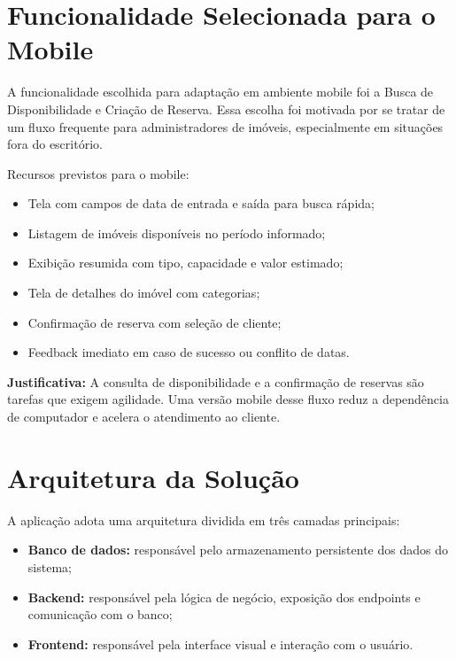 \documentclass[12pt, a4paper]{article}
\begin{document}
\section{Funcionalidade Selecionada para o Mobile}

A funcionalidade escolhida para adaptação em ambiente mobile foi a Busca de Disponibilidade e Criação de Reserva. Essa escolha foi motivada por se tratar de um fluxo frequente para administradores de imóveis, especialmente em situações fora do escritório.

Recursos previstos para o mobile:

\begin{itemize}[leftmargin=1.5em]
  \item Tela com campos de data de entrada e saída para busca rápida;
  \item Listagem de imóveis disponíveis no período informado;
  \item Exibição resumida com tipo, capacidade e valor estimado;
  \item Tela de detalhes do imóvel com categorias;
  \item Confirmação de reserva com seleção de cliente;
  \item Feedback imediato em caso de sucesso ou conflito de datas.
\end{itemize}

\textbf{Justificativa:} A consulta de disponibilidade e a confirmação de reservas são tarefas que exigem agilidade. Uma versão mobile desse fluxo reduz a dependência de computador e acelera o atendimento ao cliente.

\section{Arquitetura da Solução}

A aplicação adota uma arquitetura dividida em três camadas principais:

\begin{itemize}[leftmargin=1.5em]
  \item \textbf{Banco de dados:} responsável pelo armazenamento persistente dos dados do sistema;
  \item \textbf{Backend:} responsável pela lógica de negócio, exposição dos endpoints e comunicação com o banco;
  \item \textbf{Frontend:} responsável pela interface visual e interação com o usuário.
\end{itemize}
\end{document}
